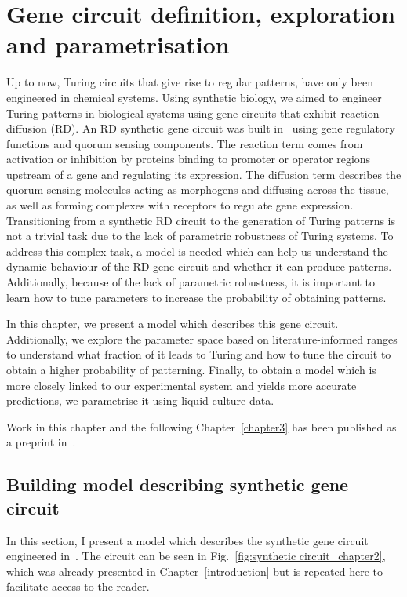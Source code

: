 \chapter{Gene circuit definition, exploration and parametrisation} \label{chapter2}
Up to now, Turing circuits that give rise to regular patterns, have only been engineered in chemical systems.
Using synthetic biology, we aimed to engineer Turing patterns in biological systems using gene circuits that exhibit reaction-diffusion (RD).
An RD synthetic gene circuit was built in~\cite{Tica2020}
using gene regulatory functions and quorum sensing components.
The reaction term comes from activation or inhibition by proteins binding to promoter or operator regions upstream of a gene
and regulating its expression.
The diffusion term describes the quorum-sensing molecules acting as morphogens and diffusing across the tissue,
as well as forming complexes with receptors to regulate gene expression.
Transitioning from a synthetic RD circuit to the generation of Turing patterns is not a trivial task due to the lack of parametric robustness of Turing systems.
To address this complex task, a model is needed which can help us understand the dynamic behaviour of the RD gene circuit and whether it can produce patterns.
Additionally, because of the lack of parametric robustness, it is important to learn how to tune parameters to increase the probability of obtaining patterns.

In this chapter, we present a model which describes this gene circuit.
Additionally, we explore the parameter space based on literature-informed ranges to understand what fraction of it leads to Turing and how to tune the circuit to obtain a higher probability of patterning.
Finally, to obtain a model which is more closely linked to our experimental system and yields more accurate predictions,
we parametrise it using liquid culture data.

Work in this chapter and the following Chapter~\ref{chapter3} has been published as a preprint in~\cite{Oliver2023}.
\section{Building model describing synthetic gene circuit}
In this section, I present a model which describes the synthetic gene circuit engineered in~\cite{Tica2020}.
The circuit can be seen in Fig.~\ref{fig:synthetic circuit_chapter2}, which was already presented in Chapter~\ref{introduction} but is repeated here to facilitate access to the reader.

